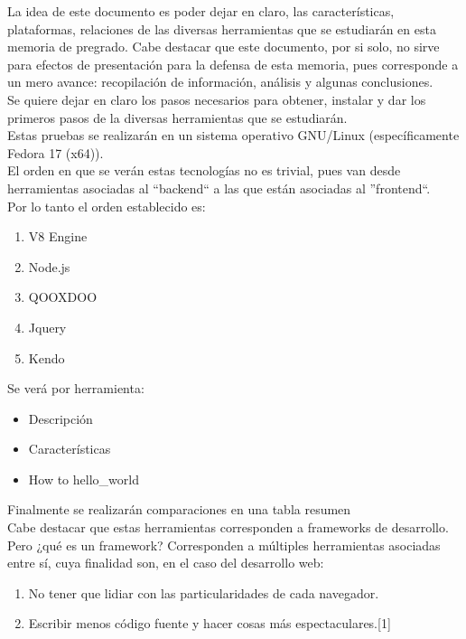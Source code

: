 La idea de este documento es poder dejar en claro, las características, plataformas, relaciones de las diversas herramientas 
que se estudiarán en esta memoria de pregrado. Cabe destacar que este documento, por si solo, no sirve para efectos de 
presentación para la defensa de esta memoria, pues corresponde a un mero avance: recopilación de información, análisis y algunas 
conclusiones.\\

Se quiere dejar en claro los pasos necesarios para obtener, instalar y dar los primeros pasos de la diversas herramientas 
que se estudiarán.\\

Estas pruebas se realizarán en un sistema operativo GNU/Linux (específicamente Fedora 17 (x64)).\\



El orden en que se verán estas tecnologías no es trivial, pues van desde herramientas asociadas
al ``backend`` a las que están asociadas al ''frontend``.\\

Por lo tanto el orden establecido es:
\begin{enumerate}
 \item V8 Engine
 \item Node.js
 \item QOOXDOO
 \item Jquery
 \item Kendo
\end{enumerate}

Se verá por herramienta:
\begin{itemize}
 \item Descripción%
 \item Características%
 \item How to hello\_world

\end{itemize}


Finalmente se realizarán comparaciones en una tabla resumen\\
%

Cabe destacar que estas herramientas corresponden a frameworks de desarrollo. Pero ¿qué es un framework?
Corresponden a múltiples  herramientas asociadas entre sí, cuya finalidad son, en el caso del desarrollo web:
\begin{enumerate}
 \item No tener que lidiar con las particularidades de cada navegador.
 \item Escribir menos código fuente y hacer cosas más espectaculares.[1]
\end{enumerate}



